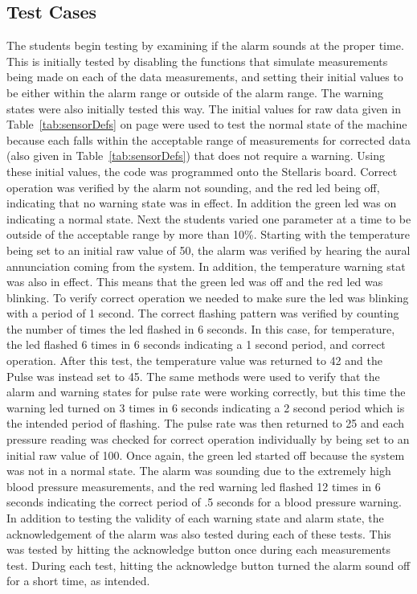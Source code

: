 \documentclass[12pt]{article} %
\begin{document}
    \subsection{Test Cases}

    The students begin testing by examining if the alarm sounds at the proper time.
    This is initially tested by disabling the functions that simulate measurements
    being made on each of the data measurements, and setting their initial values
    to be either within the alarm range or outside of the alarm range. The warning
    states were also initially tested this way. The initial values for raw data
    given in Table~\ref{tab:sensorDefs} on page \pageref{tab:sensorDefs} were used
    to test the normal state of the machine because each falls within the
    acceptable range of measurements for corrected data (also given in
    Table~\ref{tab:sensorDefs}) that does not require a warning.
    Using these initial values, the code was programmed onto the Stellaris board.
    Correct operation was verified by the alarm not sounding, and the red led being
    off, indicating that no warning state was in effect. In addition the green led
    was on indicating a normal state. Next the students varied one parameter at a
    time to be outside of the acceptable range by more than 10\%. Starting with the
    temperature being set to an initial raw value of 50, the alarm was verified by
    hearing the aural annunciation coming from the system. In addition, the
    temperature warning stat was also in effect. This means that the green led was
    off and the red led was blinking. To verify correct operation we needed to make
    sure the led was blinking with a period of 1 second. The correct flashing
    pattern was verified by counting the number of times the led flashed in 6
    seconds. In this case, for temperature, the led flashed 6 times in 6 seconds
    indicating a 1 second period, and correct operation. After this test, the
    temperature value was returned to 42 and the Pulse was instead set to 45. The
    same methods were used to verify that the alarm and warning states for pulse
    rate were working correctly, but this time the warning led turned on 3 times in
    6 seconds indicating a 2 second period which is the intended period of
    flashing. The pulse rate was then returned to 25 and each pressure reading was
    checked for correct operation individually by being set to an initial raw value
    of 100. Once again, the green led started off because the system was not in a
    normal state. The alarm was sounding due to the extremely high blood pressure
    measurements, and the red warning led flashed 12 times in 6 seconds indicating
    the correct period of .5 seconds for a blood pressure warning. In addition to
    testing the validity of each warning state and alarm state, the acknowledgement
    of the alarm was also tested during each of these tests. This was tested by
    hitting the acknowledge button once during each measurements test. During each
    test, hitting the acknowledge button turned the alarm sound off for a short
    time, as intended. 
\end{document}

